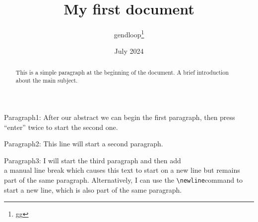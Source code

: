 \documentclass[12pt, a4paper]{article}
\title{My first document}
\author{gendloop\thanks{gg}}
\date{July 2024}
\begin{document}
\maketitle

\begin{abstract}
    This is a simple paragraph at the beginning of the
    document. A brief introduction about the main subject.
\end{abstract}

Paragraph1: After our abstract we can begin the first paragraph,
then press ``enter'' twice to start the second one.

Paragraph2: This line will start a second paragraph.

Paragraph3: I will start the third paragraph and then add \\
a manual line break which causes this text to start
on a new line but remains part of the same paragraph.
Alternatively, I can use the \verb|\newline|\newline command
to start a new line, which is also part of the same paragraph.
\end{document}
